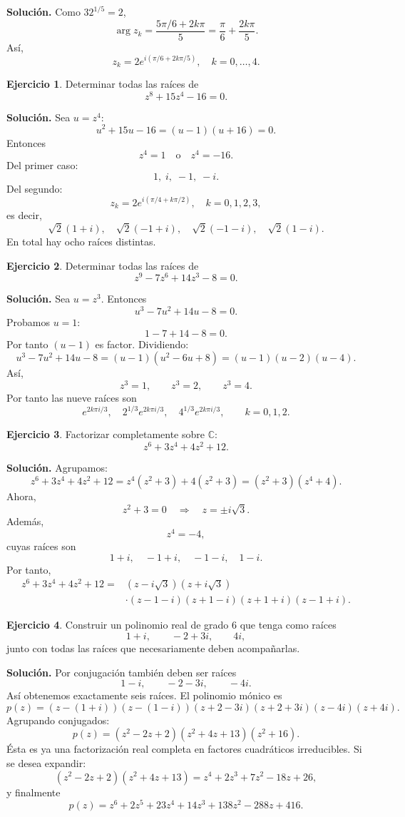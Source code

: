 \documentclass[12pt]{article}
\theoremstyle{definition}
\newtheorem{ejercicio}{Ejercicio}[section]
\theoremstyle{remark}
\newcommand{\C}{\mathbb{C}}
\begin{document}
\textbf{Solución.}
Como $32^{1/5}=2$,
\[
\arg z_k=
\frac{5\pi/6+2k\pi}{5}
=\frac{\pi}{6}+\frac{2k\pi}{5}.
\]
Así,
\[
\boxed{
z_k=2e^{i(\pi/6+2k\pi/5)},\quad k=0,\ldots,4.
}
\]

\begin{ejercicio}
Determinar todas las raíces de
\[
z^8+15z^4-16=0.
\]
\end{ejercicio}

\textbf{Solución.}
Sea $u=z^4$:
\[
u^2+15u-16=(u-1)(u+16)=0.
\]
Entonces
\[
z^4=1
\quad\text{o}\quad
z^4=-16.
\]
Del primer caso:
\[
1,\;i,\;-1,\;-i.
\]
Del segundo:
\[
z_k=2e^{i(\pi/4+k\pi/2)},\quad k=0,1,2,3,
\]
es decir,
\[
\sqrt2(1+i),\quad
\sqrt2(-1+i),\quad
\sqrt2(-1-i),\quad
\sqrt2(1-i).
\]
En total hay ocho raíces distintas.

\begin{ejercicio}
Determinar todas las raíces de
\[
z^9-7z^6+14z^3-8=0.
\]
\end{ejercicio}

\textbf{Solución.}
Sea $u=z^3$. Entonces
\[
u^3-7u^2+14u-8=0.
\]
Probamos $u=1$:
\[
1-7+14-8=0.
\]
Por tanto $(u-1)$ es factor. Dividiendo:
\[
u^3-7u^2+14u-8=(u-1)(u^2-6u+8)
=(u-1)(u-2)(u-4).
\]
Así,
\[
z^3=1,\qquad z^3=2,\qquad z^3=4.
\]
Por tanto las nueve raíces son
\[
\boxed{
e^{2k\pi i/3},\quad
2^{1/3}e^{2k\pi i/3},\quad
4^{1/3}e^{2k\pi i/3},
\qquad k=0,1,2.
}
\]

\begin{ejercicio}
Factorizar completamente sobre $\C$:
\[
z^6+3z^4+4z^2+12.
\]
\end{ejercicio}

\textbf{Solución.}
Agrupamos:
\[
z^6+3z^4+4z^2+12
=z^4(z^2+3)+4(z^2+3)
=(z^2+3)(z^4+4).
\]
Ahora,
\[
z^2+3=0
\quad\Longrightarrow\quad
z=\pm i\sqrt3.
\]
Además,
\[
z^4=-4,
\]
cuyas raíces son
\[
1+i,\quad -1+i,\quad -1-i,\quad 1-i.
\]
Por tanto,
\[
\boxed{
\begin{aligned}
z^6+3z^4+4z^2+12
={}&(z-i\sqrt3)(z+i\sqrt3)\\
&\cdot(z-1-i)(z+1-i)(z+1+i)(z-1+i).
\end{aligned}}
\]

\begin{ejercicio}
Construir un polinomio real de grado $6$ que tenga como raíces
\[
1+i,\qquad -2+3i,\qquad4i,
\]
junto con todas las raíces que necesariamente deben acompañarlas.
\end{ejercicio}

\textbf{Solución.}
Por conjugación también deben ser raíces
\[
1-i,\qquad -2-3i,\qquad -4i.
\]
Así obtenemos exactamente seis raíces. El polinomio mónico es
\[
p(z)=
(z-(1+i))(z-(1-i))
(z+2-3i)(z+2+3i)
(z-4i)(z+4i).
\]
Agrupando conjugados:
\[
p(z)=(z^2-2z+2)(z^2+4z+13)(z^2+16).
\]
Ésta es ya una factorización real completa en factores cuadráticos
irreducibles. Si se desea expandir:
\[
(z^2-2z+2)(z^2+4z+13)
=z^4+2z^3+7z^2-18z+26,
\]
y finalmente
\[
\boxed{
p(z)=z^6+2z^5+23z^4+14z^3+138z^2-288z+416.
}
\]
\end{document}
